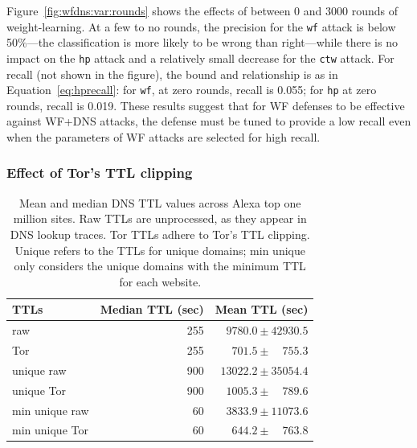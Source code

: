 Figure~\ref{fig:wfdns:var:rounds} shows the effects of between 0 and 3000
rounds of weight-learning. At a few to no rounds, the precision for the \texttt{wf}
attack is below 50\%---the classification is more likely to be wrong than
right---while there is no impact on the \texttt{hp} attack and a relatively
small decrease for the \texttt{ctw} attack.
For recall (not shown in the figure), the bound and relationship is
as in Equation~\ref{eq:hprecall}: for \texttt{wf}, at zero rounds, recall is 0.055; for
\texttt{hp} at zero rounds, recall is 0.019. These results suggest that for WF defenses to
be effective against WF+DNS attacks, the defense must be tuned to provide a
low recall even when the parameters of WF attacks are selected for high
recall.

\subsubsection{Effect of Tor's TTL clipping}

\begin{table}[t]
\centering
\begin{tabular}{l r r}
\toprule
\textbf{TTLs} & \textbf{Median TTL (sec)} & \textbf{Mean TTL (sec)} \\
\midrule
raw & 255 & $9780.0\pm42930.5$ \\ %
Tor & 255 & $701.5\pm\phantom{00}755.3$ \\ %
unique raw & 900 & $13022.2\pm35054.4$ \\ %
unique Tor & 900 & $1005.3\pm\phantom{00}789.6$ \\ %
min unique raw & 60 & $3833.9\pm11073.6$ \\ %
min unique Tor & 60 & $644.2\pm\phantom{00}763.8$ \\ %
\bottomrule
\end{tabular}
\caption{Mean and median DNS TTL values across Alexa top one million
  sites. Raw TTLs are unprocessed, as they appear in DNS lookup
  traces. Tor TTLs adhere to Tor's TTL clipping. 
Unique refers to the TTLs for unique domains; min unique only
considers the unique domains with the minimum TTL for each website.}
\label{tab:ttls}
\end{table}

